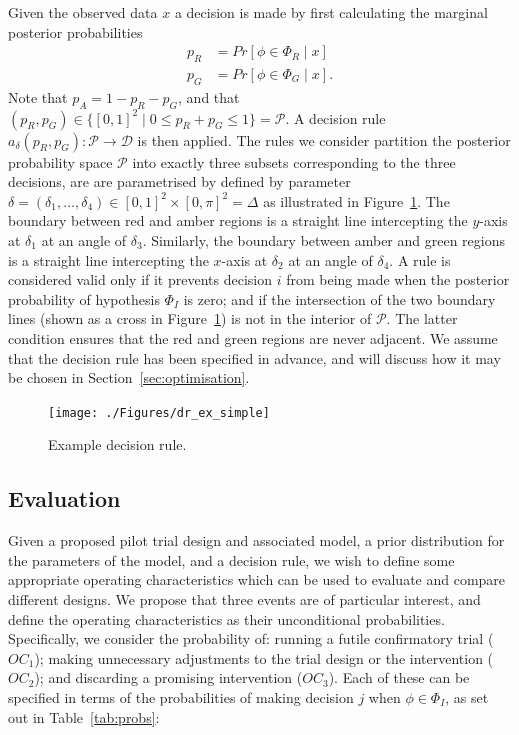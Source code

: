 \documentclass{article} %
\begin{document}
Given the observed data $x$ a decision is made by first calculating the marginal posterior probabilities
\begin{align}
p_{R} & = Pr[\phi \in \Phi_{R} \mid x] \\
p_{G} & = Pr[\phi \in \Phi_{G} \mid x].
\end{align}
Note that $p_{A} = 1 - p_{R} - p_{G}$, and that $(p_{R}, p_{G}) \in \{[0,1]^{2} \mid 0 \leq p_{R} + p_{G} \leq 1 \} = \mathcal{P}$. A decision rule $a_{\delta}(p_{R}, p_{G}): \mathcal{P} \rightarrow \mathcal{D}$ is then applied.  The rules we consider  partition the posterior probability space $\mathcal{P}$ into exactly three subsets corresponding to the three decisions, are are parametrised by defined by parameter $\delta = (\delta_{1} , \ldots , \delta_{4}) \in [0,1]^{2} \times [0, \pi]^{2} = \Delta$ as illustrated in Figure~\ref{fig:rule_simple}. The boundary between red and amber regions is a straight line intercepting the $y$-axis at $\delta_{1}$ at an angle of $\delta_{3}$. Similarly, the boundary between amber and green regions is a straight line intercepting the $x$-axis at $\delta_{2}$ at an angle of $\delta_{4}$. A rule is considered valid only if it prevents decision $i$ from being made when the posterior probability of hypothesis $\Phi_{I}$ is zero; and if the intersection of the two boundary lines (shown as a cross in Figure~\ref{fig:rule_simple}) is not in the interior of $\mathcal{P}$. The latter condition ensures that the red and green regions are never adjacent. We assume that the decision rule has been specified in advance, and will discuss how it may be chosen in Section~\ref{sec:optimisation}. 

\begin{figure}
\centering
\texttt{[image: ./Figures/dr\_ex\_simple]}
\caption{Example decision rule.}
\label{fig:rule_simple}
\end{figure}

\subsection{Evaluation}\label{sec:evaluation}

Given a proposed pilot trial design and associated model, a prior distribution for the parameters of the model, and a decision rule, we wish to define some appropriate operating characteristics which can be used to evaluate and compare different designs. We propose that three events are of particular interest, and define the operating characteristics as their unconditional probabilities. Specifically, we consider the probability of: running a futile confirmatory trial ($OC_{1}$); making unnecessary adjustments to the trial design or the intervention ($OC_{2}$); and discarding a promising intervention ($OC_{3}$). Each of these can be specified in terms of the probabilities of making decision $j$ when $\phi \in \Phi_{I}$, as set out in Table~\ref{tab:probs}:
\end{document}
